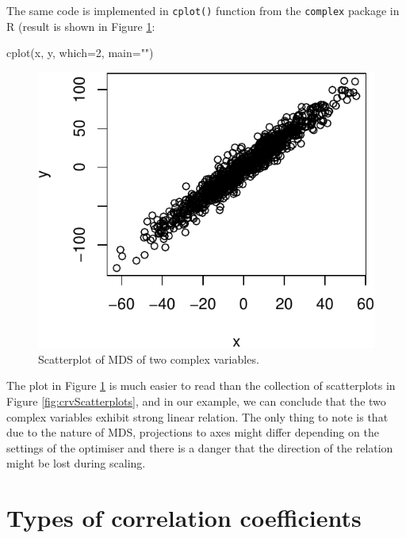 \documentclass[
]{book}
\newenvironment{Shaded}{\begin{snugshade}}{\end{snugshade}}
\newcommand{\AttributeTok}[1]{\textcolor[rgb]{0.77,0.63,0.00}{#1}}
\newcommand{\DecValTok}[1]{\textcolor[rgb]{0.00,0.00,0.81}{#1}}
\newcommand{\FunctionTok}[1]{\textcolor[rgb]{0.00,0.00,0.00}{#1}}
\newcommand{\NormalTok}[1]{#1}
\newcommand{\StringTok}[1]{\textcolor[rgb]{0.31,0.60,0.02}{#1}}
\begin{document}
The same code is implemented in \texttt{cplot()} function from the \texttt{complex} package in R (result is shown in Figure \ref{fig:crvScatterplotMDS}:

\begin{Shaded}
\begin{Highlighting}[]
\FunctionTok{cplot}\NormalTok{(x, y, }\AttributeTok{which=}\DecValTok{2}\NormalTok{, }\AttributeTok{main=}\StringTok{""}\NormalTok{)}
\end{Highlighting}
\end{Shaded}

\begin{figure}
\centering
\includegraphics{Svetunkov---Svetunkov---Complex-Valued-Econometrics_files/figure-latex/crvScatterplotMDS-1.pdf}
\caption{\label{fig:crvScatterplotMDS}Scatterplot of MDS of two complex variables.}
\end{figure}

The plot in Figure \ref{fig:crvScatterplotMDS} is much easier to read than the collection of scatterplots in Figure \ref{fig:crvScatterplots}, and in our example, we can conclude that the two complex variables exhibit strong linear relation. The only thing to note is that due to the nature of MDS, projections to axes might differ depending on the settings of the optimiser and there is a danger that the direction of the relation might be lost during scaling.

\hypertarget{correlationTypes}{%
\section{Types of correlation coefficients}\label{correlationTypes}}
\end{document}
